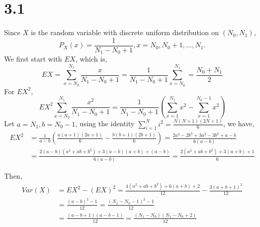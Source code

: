 \documentclass[letter]{article}
\begin{document}
    \section*{3.1}
    Since $X$ is the random variable with discrete uniform distribution on $(N_0, N_1)$, 
    \[
    P_X(x) = \frac{1}{N_1-N_0+1}, x = N_0, N_0 + 1, \dots, N_1.
    \]
    We first start with $EX$, which is,
    \[
    EX = \sum_{x=N_0}^{N_1} \frac{x}{N_1 - N_0 + 1} = \frac{1}{N_1 - N_0 + 1} \sum_{x=N_0}^{N_1} = \frac{N_0 + N_1}{2}
    \]
    For $EX^2$, 
    \[
    EX^2 \sum_{x=N_0}^{N_1} \frac{x^2}{N_1 - N_0 + 1} = \frac{1}{N_1-N_0+1} \left(\sum_{x=1}^{N_1} x^2 - \sum_{x=1}^{N_0-1} x^2 \right)
    \]
    Let $a = N_1, b = N_0 - 1$, using the identity 
    $ \sum_{i=1}^{N} i^2 = \frac{N(N+1)(2N+1)}{6}$,
    we have,
    \begin{align*}
    EX^2 & = \frac{1}{a-b} \left(\frac{a(a+1)(2a+1)}{6} - \frac{b(b+1)(2b+1)}{6}\right) = \frac{2a^3 - 2b^3 + 3a^2 - 3b^2 + a-b}{6(a-b)} \\
    & = \frac{2(a-b)(a^2 + ab + b^2) + 3(a-b)(a+b) + (a-b)}{6(a-b)} 
    = \frac{2(a^2 + ab+ b^2) + 3(a+b) + 1}{6}
    \end{align*}

    Then,
    \begin{align*}
    Var(X) & = EX^2 - (EX)^2 = \frac{4(a^2+ab+b^2) + 6(a+b) +2}{12} - \frac{3(a+b+1)^2}{12}\\
    & = \frac{(a-b)^2 -1}{12} = \frac{(N_1-N_0-1)^2-1}{12} \\
    & =\frac{(a-b+1)(a-b-1)}{12} = \frac{(N_1-N_0)(N_1-N_0+2)}{12}
    \end{align*}
\end{document}
